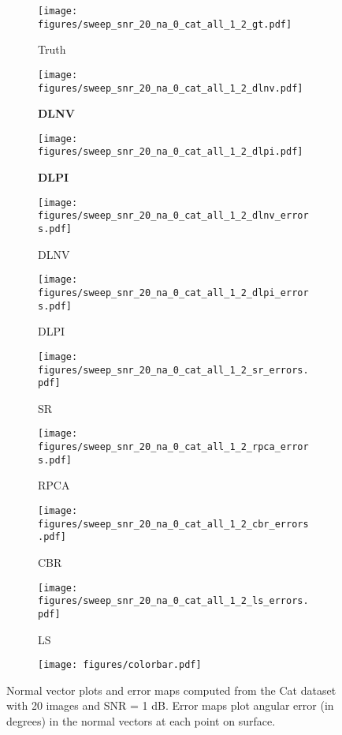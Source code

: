 \begin{figure*}
\begin{subfigure}[b]{0.105\textwidth}
  \texttt{[image: figures/sweep\_snr\_20\_na\_0\_cat\_all\_1\_2\_gt.pdf]}
  \caption{Truth}
\end{subfigure}
\hspace{-2mm}
\begin{subfigure}[b]{0.105\textwidth}
  \texttt{[image: figures/sweep\_snr\_20\_na\_0\_cat\_all\_1\_2\_dlnv.pdf]}
  \caption{\textbf{DLNV}}
\end{subfigure}
\hspace{-2mm}
\begin{subfigure}[b]{0.105\textwidth}
  \texttt{[image: figures/sweep\_snr\_20\_na\_0\_cat\_all\_1\_2\_dlpi.pdf]}
  \caption{\textbf{DLPI}}
\end{subfigure}
\begin{subfigure}[b]{0.105\textwidth}
  \texttt{[image: figures/sweep\_snr\_20\_na\_0\_cat\_all\_1\_2\_dlnv\_errors.pdf]}
  \caption{DLNV}
\end{subfigure}
\hspace{-2mm}
\begin{subfigure}[b]{0.105\textwidth}
  \texttt{[image: figures/sweep\_snr\_20\_na\_0\_cat\_all\_1\_2\_dlpi\_errors.pdf]}
  \caption{DLPI}
\end{subfigure}
\hspace{-2mm}
\begin{subfigure}[b]{0.105\textwidth}
  \texttt{[image: figures/sweep\_snr\_20\_na\_0\_cat\_all\_1\_2\_sr\_errors.pdf]}
  \caption{SR}
\end{subfigure}
\hspace{-2mm}
\begin{subfigure}[b]{0.105\textwidth}
  \texttt{[image: figures/sweep\_snr\_20\_na\_0\_cat\_all\_1\_2\_rpca\_errors.pdf]}
  \caption{RPCA}
\end{subfigure}
\hspace{-2mm}
\begin{subfigure}[b]{0.105\textwidth}
  \texttt{[image: figures/sweep\_snr\_20\_na\_0\_cat\_all\_1\_2\_cbr\_errors.pdf]}
  \caption{CBR}
\end{subfigure}
\hspace{-2mm}
\begin{subfigure}[b]{0.105\textwidth}
  \texttt{[image: figures/sweep\_snr\_20\_na\_0\_cat\_all\_1\_2\_ls\_errors.pdf]}
  \caption{LS}
\end{subfigure}
\begin{subfigure}[b]{0.0275\textwidth} 
  \texttt{[image: figures/colorbar.pdf]}
  \caption*{}
\end{subfigure}
\caption{Normal vector plots and error maps computed from the Cat dataset \cite{xiong2015shading} with 20 images and SNR = 1 dB. Error maps plot angular error (in degrees) in the normal vectors at each point on surface.}
\label{fig:sweep_snr_20_na_0_cat_all_1_2}
\vspace{-3mm}
\end{figure*}





